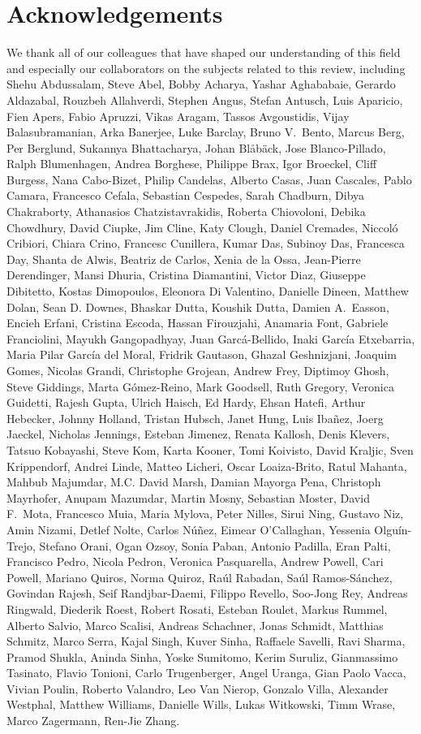  \section{Acknowledgements}
 We thank all of our colleagues  that have shaped our understanding of this field and especially our collaborators on the subjects related to this review, including Shehu Abdussalam, Steve Abel,  Bobby Acharya, Yashar Aghababaie, Gerardo Aldazabal, Rouzbeh Allahverdi, Stephen Angus, Stefan Antusch, Luis Aparicio, Fien Apers, Fabio Apruzzi, Vikas Aragam, Tassos Avgoustidis,
 Vijay Balasubramanian, Arka Banerjee, Luke Barclay, Bruno V.~Bento, Marcus Berg, Per Berglund, Sukannya Bhattacharya,  Johan Bl{\aa}b\"ack, Jose Blanco-Pillado, Ralph Blumenhagen, Andrea Borghese, Philippe Brax, Igor Broeckel,   Cliff Burgess, Nana Cabo-Bizet, Philip Candelas, Alberto Casas, Juan Cascales, Pablo Camara, Francesco Cefala, Sebastian Cespedes, Sarah Chadburn, Dibya Chakraborty, Athanasios Chatzistavrakidis, Roberta Chiovoloni, Debika Chowdhury, David Ciupke, Jim Cline, Katy Clough, Daniel Cremades, Niccol\'o Cribiori, Chiara Crino, Francesc Cunillera, Kumar Das, Subinoy Das, Francesca Day,
  Shanta de Alwis,  Beatriz de Carlos, Xenia de la Ossa, Jean-Pierre Derendinger, Mansi Dhuria, Cristina Diamantini, Victor Diaz, Giuseppe Dibitetto, Kostas Dimopoulos, Eleonora Di Valentino,  Danielle Dineen, Matthew Dolan, Sean D. Downes, Bhaskar Dutta, Koushik Dutta, Damien A.~Easson,  Encieh Erfani, Cristina Escoda, Hassan Firouzjahi, Anamaria Font, Gabriele Franciolini, Mayukh Gangopadhyay, Juan Garc\'a-Bellido, Inaki Garc\'ia Etxebarria, Maria Pilar Garc\'ia del Moral, Fridrik Gautason, Ghazal Geshnizjani, Joaquim Gomes, Nicolas Grandi, Christophe Grojean, Andrew Frey, Diptimoy Ghosh, Steve Giddings, Marta G\'omez-Reino, Mark Goodsell, Ruth Gregory, Veronica Guidetti, Rajesh Gupta, Ulrich Haisch, Ed Hardy, Ehsan Hatefi,  Arthur Hebecker, Johnny Holland, Tristan Hubsch, Janet Hung, Luis Iba\~nez, Joerg Jaeckel, Nicholas Jennings, Esteban Jimenez, Renata Kallosh, Denis Klevers, Tatsuo Kobayashi, Steve Kom, Karta Kooner, Tomi Koivisto, David Kraljic, Sven Krippendorf, Andrei Linde,  Matteo Licheri, Oscar Loaiza-Brito, Ratul Mahanta, Mahbub Majumdar, M.C. David Marsh, Damian Mayorga Pena, Christoph Mayrhofer, Anupam Mazumdar,  Martin Mosny, Sebastian Moster, David F.~Mota, Francesco Muia, Maria Mylova, Peter Nilles, Sirui Ning, Gustavo Niz, Amin Nizami, Detlef Nolte, Carlos N\'u\~nez, Eimear O'Callaghan, Yessenia Olgu\'in-Trejo, Stefano Orani, Ogan Ozsoy, Sonia Paban, Antonio Padilla, Eran Palti, Francisco Pedro, Nicola Pedron, Veronica Pasquarella, Andrew Powell, Cari Powell, Mariano Quiros, Norma Quiroz, Ra\'ul Rabadan, Sa\'ul Ramos-S\'anchez, Govindan Rajesh, Seif Randjbar-Daemi, Filippo Revello, Soo-Jong Rey, Andreas Ringwald, Diederik Roest, Robert Rosati, Esteban Roulet, Markus Rummel, Alberto Salvio, Marco Scalisi,  Andreas Schachner, Jonas Schmidt, Matthias Schmitz, Marco Serra, Kajal Singh, Kuver Sinha, Raffaele Savelli, Ravi Sharma, Pramod Shukla, Aninda Sinha, Yoske Sumitomo, Kerim Suruliz, Gianmassimo Tasinato, Flavio Tonioni, Carlo Trugenberger, Angel Uranga, Gian Paolo Vacca, Vivian Poulin,  Roberto Valandro, Leo Van Nierop, Gonzalo Villa, Alexander Westphal, Matthew Williams, Danielle Wills, Lukas Witkowski, Timm Wrase, Marco Zagermann, Ren-Jie Zhang. 
